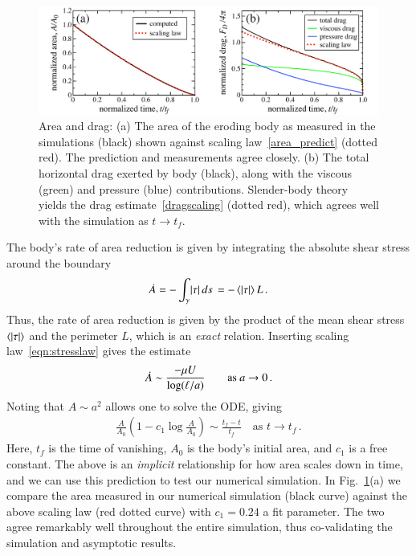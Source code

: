 \documentclass[preprint, 10pt]{elsarticle}
\begin{document}
\begin{figure}%
\begin{center}
\includegraphics[width = 0.9 \textwidth]{./figs/area_drag.pdf}
\caption{Area and drag: (a) The area of the eroding body as measured in the simulations (black) shown against scaling law~\eqref{area_predict} (dotted red). The prediction and measurements agree closely. (b) The total horizontal drag exerted by body (black), along with the viscous (green) and pressure (blue) contributions. Slender-body theory yields the drag estimate~\eqref{dragscaling} (dotted red), which agrees well with the simulation as $t \to t_f$.}
\label{area_drag}
\end{center}
\end{figure}

The body's rate of area reduction is given by integrating the absolute shear stress around the boundary
\begin{align}
\dot{A} = - \int_{\gamma} \lvert \tau \rvert \, ds \,  = - \left< \lvert \tau \rvert \right> L \, .
\end{align}
Thus, the rate of area reduction is given by the product of the mean shear stress $\left< \lvert \tau \rvert \right>$ and the perimeter $L$, which is an {\em exact} relation. Inserting scaling law~\eqref{eqn:stresslaw} gives the estimate
\begin{align}
\dot{A} \sim \frac{ - \mu U}{\log(\ell/a)} \qquad \text{as } a \to 0 \, . 
\end{align}
Noting that $A \sim a^2$ allows one to solve the ODE, giving
\begin{align}
\label{area_predict}
\frac{A}{A_0} \left( 1 - c_1 \log{\frac{A}{A_0}} \right) \sim \frac{t_f - t}{t_f} \quad \text{as } t \to t_f \, .
\end{align}
Here, $t_f$ is the time of vanishing, $A_0$ is the body's initial area, and $c_1$ is a free constant. The above is an {\em implicit} relationship for how area scales down in time, and we can use this prediction to test our numerical simulation. In Fig.~\ref{area_drag}(a) we compare the area measured in our numerical simulation (black curve) against the above scaling law (red dotted curve) with $c_1 = 0.24$ a fit parameter. The two agree remarkably well throughout the entire simulation, thus co-validating the simulation and asymptotic results.
\end{document}
